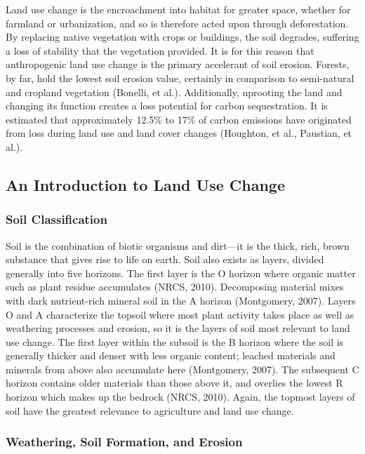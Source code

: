 \documentclass{book}\usepackage{knitr}
\begin{document}
Land use change is the encroachment into habitat for greater space, whether for farmland or urbanization, and so is therefore acted upon through deforestation. By replacing native vegetation with crops or buildings, the soil degrades, suffering a loss of stability that the vegetation provided. It is for this reason that anthropogenic land use change is the primary accelerant of soil erosion. Forests, by far, hold the lowest soil erosion value, certainly in comparison to semi-natural and cropland vegetation (Bonelli, et al.). Additionally, uprooting the land and changing its function creates  a loss potential for carbon sequestration. It is estimated that approximately 12.5\% to 17\% of carbon emissions have originated from loss during land use and land cover changes (Houghton, et al., Paustian, et al.).

\subsection{An Introduction to Land Use Change}

\subsubsection{Soil Classification}

Soil is the combination of biotic organisms and dirt—it is the thick, rich, brown substance that gives rise to life on earth. Soil also exists as layers, divided generally into five horizons. The first layer is the O horizon where organic matter such as plant residue accumulates (NRCS, 2010). Decomposing material mixes with dark nutrient-rich mineral soil in the A horizon (Montgomery, 2007). Layers O and A characterize the topsoil where most plant activity takes place as well as weathering processes and erosion, so it is the layers of soil most relevant to land use change. The first layer within the subsoil is the B horizon where the soil is generally thicker and denser with less organic content; leached materials and minerals from above also accumulate here (Montgomery, 2007). The subsequent C horizon contains older materials than those above it, and overlies the lowest R horizon which makes up the bedrock (NRCS, 2010). Again, the topmost layers of soil have the greatest relevance to agriculture and land use change.

\subsubsection{Weathering, Soil Formation, and Erosion}
\end{document}
